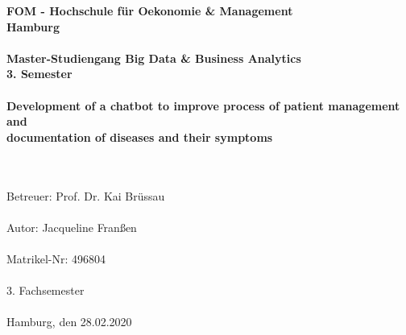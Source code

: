 		\begin{titlepage}
			\begin{center}
			\renewcommand{\baselinestretch}{1.5}
					\textbf{\large FOM - Hochschule für Oekonomie \& Management \\
						Hamburg \\
						\ \\
						Master-Studiengang Big Data \& Business Analytics \\
						3. Semester \\
						\ \\
						Development of a chatbot to improve process of patient management and  \ \\		 documentation of diseases and their symptoms \ \\
						\ \\
						}
						
					\textrm{
						\ \\
						Betreuer: Prof. Dr. Kai Brüssau \\
						\ \\
						Autor: Jacqueline Franßen \\
						\ \\
						Matrikel-Nr: 496804 \\
						\ \\
						3. Fachsemester \\
						\ \\
						Hamburg, den 28.02.2020 \\
						}
			\end{center}
		\end{titlepage}

%

			\setcounter{tocdepth}{3}
			\setcounter{secnumdepth}{3}		
			\thispagestyle{empty}
			\tableofcontents
			\newpage
			\listoffigures
			\listoftables

			\thispagestyle{empty}